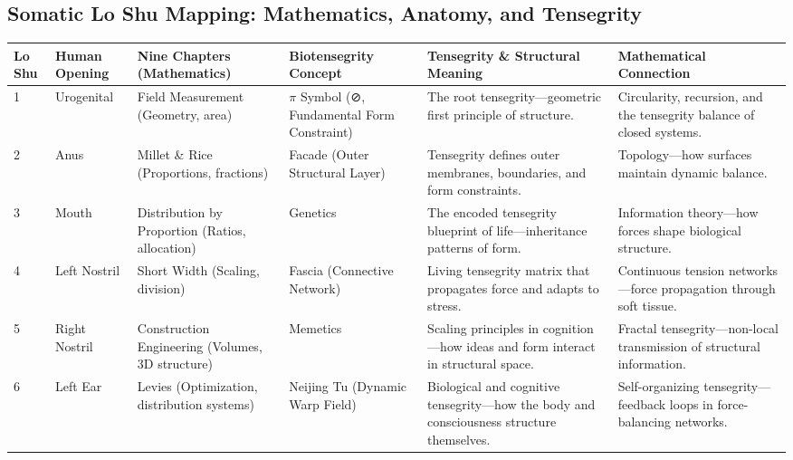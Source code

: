 \documentclass{article}
\begin{document}
\begin{landscape}

\section*{Somatic Lo Shu Mapping: Mathematics, Anatomy, and Tensegrity}

\renewcommand{\arraystretch}{1.4}

\begin{tabular}{|p{1.5cm}|p{2.8cm}|p{3.8cm}|p{3.8cm}|p{5.2cm}|p{5.2cm}|}
\hline
\textbf{Lo Shu} & 
\textbf{Human Opening} & 
\textbf{Nine Chapters (Mathematics)} & 
\textbf{Biotensegrity Concept} & 
\textbf{Tensegrity \& Structural Meaning} & 
\textbf{Mathematical Connection} \\
\hline

1 & 
Urogenital & 
Field Measurement (Geometry, area) & 
$\pi$ Symbol (⊘, Fundamental Form Constraint) & 
The root tensegrity—geometric first principle of structure. & 
Circularity, recursion, and the tensegrity balance of closed systems. \\
\hline

2 & 
Anus & 
Millet \& Rice (Proportions, fractions) & 
Facade (Outer Structural Layer) & 
Tensegrity defines outer membranes, boundaries, and form constraints. & 
Topology—how surfaces maintain dynamic balance. \\
\hline

3 & 
Mouth & 
Distribution by Proportion (Ratios, allocation) & 
Genetics & 
The encoded tensegrity blueprint of life—inheritance patterns of form. & 
Information theory—how forces shape biological structure. \\
\hline

4 & 
Left Nostril & 
Short Width (Scaling, division) & 
Fascia (Connective Network) & 
Living tensegrity matrix that propagates force and adapts to stress. & 
Continuous tension networks—force propagation through soft tissue. \\
\hline

5 & 
Right Nostril & 
Construction Engineering (Volumes, 3D structure) & 
Memetics & 
Scaling principles in cognition—how ideas and form interact in structural space. & 
Fractal tensegrity—non-local transmission of structural information. \\
\hline

6 & 
Left Ear & 
Levies (Optimization, distribution systems) & 
Neijing Tu (Dynamic Warp Field) & 
Biological and cognitive tensegrity—how the body and consciousness structure themselves. & 
Self-organizing tensegrity—feedback loops in force-balancing networks. \\
\hline


\end{tabular}
\end{landscape}
\end{document}
